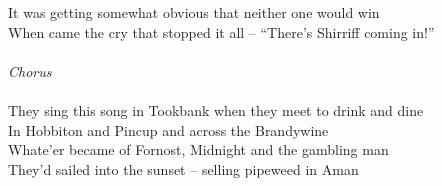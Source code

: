 \begin{multicols}{2}
It was getting somewhat obvious that neither one would win
\\
When came the cry that stopped it all – “There’s Shirriff coming in!”
\\
\\
\textit{Chorus}
\\
\\
They sing this song in Tookbank when they meet to drink and dine
\\
In Hobbiton and Pincup and across the Brandywine
\\
Whate’er became of Fornost, Midnight and the gambling man
\\
They’d sailed into the sunset – selling pipeweed in Aman
\end{multicols}